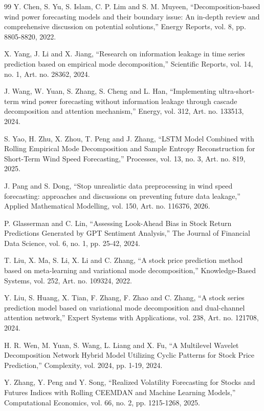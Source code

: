 \begin{thebibliography}{99}
 Y. Chen, S. Yu, S. Islam, C. P. Lim and S. M. Muyeen, ``Decomposition-based wind power
forecasting models and their boundary issue: An in-depth review and comprehensive
discussion on potential solutions,'' Energy Reports, vol. 8, pp. 8805-8820, 2022.

 X. Yang, J. Li and X. Jiang, ``Research on information leakage in time series
prediction based on empirical mode decomposition,'' Scientific Reports, vol. 14, no.
1, Art. no. 28362, 2024.

 J. Wang, W. Yuan, S. Zhang, S. Cheng and L. Han, ``Implementing ultra-short-term wind
power forecasting without information leakage through cascade decomposition and
attention mechanism,'' Energy, vol. 312, Art. no. 133513, 2024.

 S. Yao, H. Zhu, X. Zhou, T. Peng and J. Zhang, ``LSTM Model Combined with Rolling
Empirical Mode Decomposition and Sample Entropy Reconstruction for Short-Term Wind
Speed Forecasting,'' Processes, vol. 13, no. 3, Art. no. 819, 2025.

 J. Pang and S. Dong, ``Stop unrealistic data preprocessing in wind speed forecasting:
approaches and discussions on preventing future data leakage,'' Applied Mathematical
Modelling, vol. 150, Art. no. 116376, 2026.

 P. Glasserman and C. Lin, ``Assessing Look-Ahead Bias in Stock Return Predictions
Generated by GPT Sentiment Analysis,'' The Journal of Financial Data Science, vol. 6,
no. 1, pp. 25-42, 2024.

 T. Liu, X. Ma, S. Li, X. Li and C. Zhang, ``A stock price prediction method based on
meta-learning and variational mode decomposition,'' Knowledge-Based Systems, vol. 252,
Art. no. 109324, 2022.

 Y. Liu, S. Huang, X. Tian, F. Zhang, F. Zhao and C. Zhang, ``A stock series prediction
model based on variational mode decomposition and dual-channel attention network,''
Expert Systems with Applications, vol. 238, Art. no. 121708, 2024.

 H. R. Wen, M. Yuan, S. Wang, L. Liang and X. Fu, ``A Multilevel Wavelet Decomposition
Network Hybrid Model Utilizing Cyclic Patterns for Stock Price Prediction,''
Complexity, vol. 2024, pp. 1-19, 2024.

 Y. Zhang, Y. Peng and Y. Song, ``Realized Volatility Forecasting for Stocks and
Futures Indices with Rolling CEEMDAN and Machine Learning Models,'' Computational
Economics, vol. 66, no. 2, pp. 1215-1268, 2025.


\end{thebibliography}
